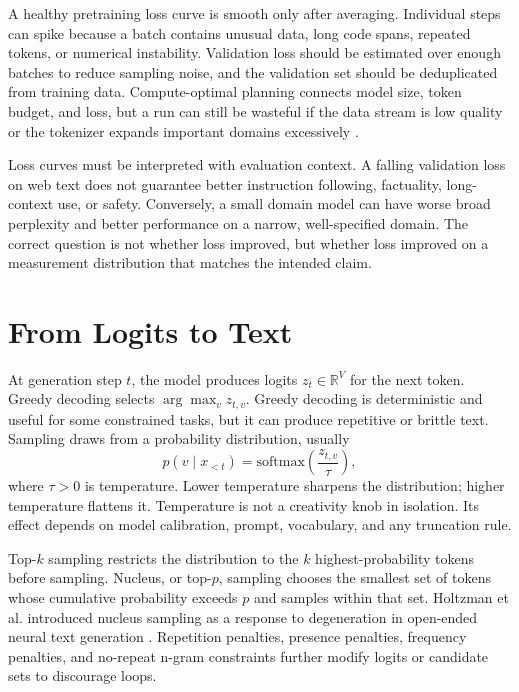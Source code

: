 A healthy pretraining loss curve is smooth only after averaging. Individual steps can spike because a batch contains unusual data, long code spans, repeated tokens, or numerical instability. Validation loss should be estimated over enough batches to reduce sampling noise, and the validation set should be deduplicated from training data. Compute-optimal planning connects model size, token budget, and loss, but a run can still be wasteful if the data stream is low quality or the tokenizer expands important domains excessively \cite{hoffmann2022training}.

Loss curves must be interpreted with evaluation context. A falling validation loss on web text does not guarantee better instruction following, factuality, long-context use, or safety. Conversely, a small domain model can have worse broad perplexity and better performance on a narrow, well-specified domain. The correct question is not whether loss improved, but whether loss improved on a measurement distribution that matches the intended claim.

\section{From Logits to Text}
\label{sec:from-logits-to-text}

At generation step $t$, the model produces logits $z_t\in\mathbb{R}^{V}$ for the next token. Greedy decoding selects $\arg\max_v z_{t,v}$. Greedy decoding is deterministic and useful for some constrained tasks, but it can produce repetitive or brittle text. Sampling draws from a probability distribution, usually
\begin{equation}
  p(v\mid x_{<t}) =
  \mathrm{softmax}(\frac{z_{t,v}}{\tau}),
\end{equation}
where $\tau>0$ is temperature. Lower temperature sharpens the distribution; higher temperature flattens it. Temperature is not a creativity knob in isolation. Its effect depends on model calibration, prompt, vocabulary, and any truncation rule.

Top-$k$ sampling restricts the distribution to the $k$ highest-probability tokens before sampling. Nucleus, or top-$p$, sampling chooses the smallest set of tokens whose cumulative probability exceeds $p$ and samples within that set. Holtzman et al. introduced nucleus sampling as a response to degeneration in open-ended neural text generation \cite{holtzman2020curious}. Repetition penalties, presence penalties, frequency penalties, and no-repeat n-gram constraints further modify logits or candidate sets to discourage loops.

